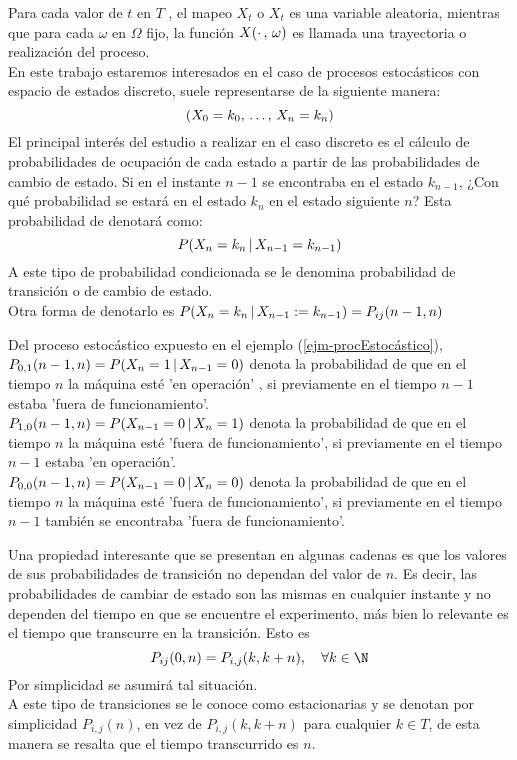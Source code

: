 Para cada valor de $t$ en $T$ , el mapeo $X_t$ o $X_t$ es una variable aleatoria, mientras que para cada $\omega$ en $\Omega$ fijo, la función $X(\cdot\thinspace,\thinspace\omega)$ es llamada una trayectoria o realización del proceso.\\En este trabajo estaremos interesados en el caso de procesos estocásticos con espacio de estados discreto, suele representarse de la siguiente
manera: $$(X_0=k_0,\thinspace\ldots,\thinspace X_n=k_n)$$
El principal interés del estudio a realizar en el caso discreto es el cálculo de probabilidades de ocupación de cada estado a partir de las probabilidades de cambio de estado. Si en el instante $n-1$ se encontraba en el estado $k_{n-1}$, ¿Con qué probabilidad se estará en el estado $k_n$ en
el estado siguiente $n$? Esta probabilidad de denotará como:
$$P(X_n = k_n\thinspace | \thinspace X_{n-1} = k_{n-1})$$
A este tipo de probabilidad condicionada se le denomina probabilidad de transición o de cambio de estado.\\Otra forma de denotarlo es $P(X_n = k_n\thinspace | \thinspace X_{n-1} := k_{n-1})=P_{i j}{(n-1,n)}$
\begin{Ejm}
    Del proceso estocástico expuesto en el ejemplo (\ref{ejm-procEstocástico}), \\$P_{0,1}(n-1,n)=P(X_n=1\thinspace|\thinspace X_{n-1}=0)$ denota la probabilidad de que en el tiempo $n$ la máquina esté 'en operación' , si previamente en el tiempo $n-1$ estaba 'fuera de funcionamiento'.\\
    $P_{1,0}(n-1,n)=P(X_{n-1}=0\thinspace|\thinspace X_n=1)$ denota la probabilidad de que en el tiempo $n$ la máquina esté 'fuera de funcionamiento', si previamente en el tiempo $n-1$ estaba 'en operación'.\\
    $P_{0,0}(n-1,n)=P(X_{n-1}=0\thinspace|\thinspace X_n=0)$ denota la probabilidad de que en el tiempo $n$ la máquina esté 'fuera de funcionamiento', si previamente en el tiempo $n-1$ también se encontraba 'fuera de funcionamiento'.
\end{Ejm}
Una propiedad interesante que se presentan en algunas cadenas es que los valores de sus probabilidades de transición no dependan del valor de $n$. Es decir, las probabilidades de cambiar de estado son las mismas en cualquier instante y no dependen del tiempo en que se encuentre el experimento, más bien lo relevante es el tiempo que transcurre en la transición. Esto es $$P_{i j}(0,n)=P_{i,j}(k,k+n),\quad \forall k\in\N$$ Por simplicidad se asumirá tal situación.\\
A este tipo de transiciones se le conoce como estacionarias y se denotan por simplicidad $P_{i,j}(n)$, en vez de $P_{i,j}(k,k+n)$ para cualquier $k\in T$, de esta manera se resalta que el tiempo transcurrido es $n$.\\
